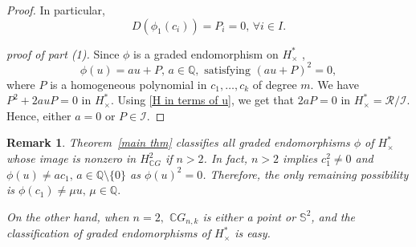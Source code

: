 \documentclass{amsart}
\newtheorem{remark}[theorem]{Remark}
\newcommand{\thmref}[1]{Theorem~\ref{#1}}
\begin{document}
\begin{proof}
In particular, $$D(\phi_1(c_i))=P_i=0, \, \forall i \in I.$$
		
		\textit{proof of part (1).} Since %
$\phi$ is a graded endomorphism on $H^*_{\times}$%
,  $$\phi(u) = a u + P, \, a \in \mathbb{Q}, \text{ satisfying } (a u + P)^2 =0,$$ where %
$P$ is a homogeneous polynomial in $c_1, \dots, c_k$ of degree $m$. We have $P^2 + 2 a u P =0$ in $H^*_{\times}$. Using \eqref{H in terms of u}, we get that $2aP =0$ in $H^*_{\times}=\mathcal{R}/\mathcal{I}$. Hence, either $a=0$ or $P\in \mathcal{I}$.
	\end{proof}
	
	
		\begin{remark}
			\thmref{main thm} classifies all graded endomorphisms $\phi$ of $H^*_\times$ whose image is nonzero in $H^2_{\mathbb CG}$ if $n>2$. In fact, $n>2$ implies $c_1^2\neq 0$ and $\phi(u) \neq ac_1,\, a \in \mathbb{Q}\setminus\{0\}$ as $\phi(u)^2=0$. Therefore, the only remaining possibility is $\phi(c_1)\neq \mu u,\, \mu \in \mathbb Q.$ 
			
			On the other hand, when $n=2,$ $\mathbb CG_{n,k}$ is either a point %
or $\mathbb S^2$, and %
the classification of graded endomorphisms of $H^*_\times$ is easy.
		\end{remark}
	
\end{document}
